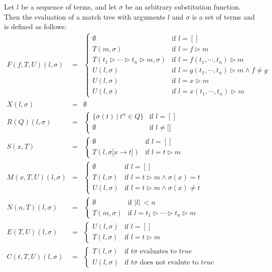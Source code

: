 \documentclass{article}
\begin{document}
Let $l$ be a sequence of terms, and let $\sigma $ be an arbitrary
substitution function. Then the evaluation of a match tree with arguments $l$
and $\sigma $ is a set of terms and is defined as follows:%
\begin{equation*}
\begin{array}{lll}
F(f,T,U)(l,\sigma ) & = & \left\{ 
\begin{array}{ll}
\emptyset & \text{if }l=[] \\ 
T(m,\sigma ) & \text{if }l=f\rhd m \\ 
T(t_{1}\rhd \cdots \rhd t_{n}\rhd m,\sigma ) & \text{if }l=f(t_{1},\cdots
,t_{n})\rhd m \\ 
U(l,\sigma ) & \text{if }l=g(t_{1},\cdots ,t_{n})\rhd m\wedge f\neq g \\ 
U(l,\sigma ) & \text{if }l=x\rhd m \\ 
U(l,\sigma ) & \text{if }l=x(t_{1},\cdots ,t_{n})\rhd m%
\end{array}%
\right. \\ 
X(l,\sigma ) & = & \emptyset \\ 
R(Q)(l,\sigma ) & = & \left\{ 
\begin{array}{ll}
\{\sigma (t)\ |\ t^{\alpha }\in Q\} & \text{if }l=[] \\ 
\emptyset & \text{if }l\neq \lbrack ]%
\end{array}%
\right. \\ 
S(x,T) & = & \left\{ 
\begin{array}{ll}
\emptyset & \text{if }l=[] \\ 
T(l,\sigma \lbrack x\rightarrow t]) & \text{if }l=t\rhd m%
\end{array}%
\right. \\ 
M(x,T,U)(l,\sigma ) & = & \left\{ 
\begin{array}{ll}
\emptyset & \text{if }l=[] \\ 
T(l,\sigma ) & \text{if }l=t\rhd m\wedge \sigma (x)=t \\ 
U(l,\sigma ) & \text{if }l=t\rhd m\wedge \sigma (x)\neq t%
\end{array}%
\right. \\ 
N(n,T)(l,\sigma ) & = & \left\{ 
\begin{array}{ll}
\emptyset & \text{if }|l|\ <n \\ 
T(m,\sigma ) & \text{if }l=t_{1}\rhd \cdots \rhd t_{n}\rhd m%
\end{array}%
\right. \\ 
E(T,U)(l,\sigma ) & = & \left\{ 
\begin{array}{ll}
U(l,\sigma ) & \text{if }l=[] \\ 
T(l,\sigma ) & \text{if }l=t\rhd m%
\end{array}%
\right. \\ 
C(t,T,U)(l,\sigma ) & = & \left\{ 
\begin{array}{ll}
T(l,\sigma ) & \text{if }t\sigma \text{ evaluates to }true \\ 
U(l,\sigma ) & \text{if }t\sigma \text{ does not evalute to }true%
\end{array}%
\right.%
\end{array}%
\end{equation*}%
\end{document}
